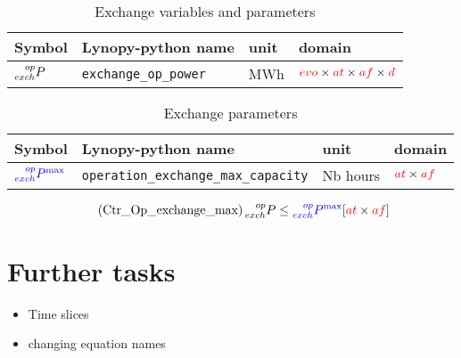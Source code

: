 \documentclass[a4paper,11pt]{article}
\begin{document}
\begin{table}[h]
\footnotesize %
  \centering
    \caption{Exchange variables and parameters}
  \begin{tabular}{llll}
    \hline
    
    \textbf{Symbol} & \textbf{Lynopy-python name} & \textbf{unit}  & \textbf{domain} \\ \hline
    
    $ \prescript{op}{exch}{P}$ & \verb|exchange_op_power|  & MWh & $\textcolor{red}{evo} \times \textcolor{red}{at} \times  \textcolor{red}{af} \times \textcolor{red}{d}$  \\
    
  \end{tabular}
\end{table}


  \begin{table}[h]
\footnotesize %
  \centering

\caption{Exchange parameters}


\begin{tabular}{llll}
\hline
    \textbf{Symbol} & \textbf{Lynopy-python name} & \textbf{unit}  & \textbf{domain} \\ \hline
    
    $\textcolor{blue}{\prescript{op}{exch}{P^{\max}}}$&  \verb|operation_exchange_max_capacity| & Nb hours & $\textcolor{red}{at} \times \textcolor{red}{af} $ \\ 
  \end{tabular}
\end{table}

\begin{equation} \tag{Ctr\_Op\_exchange\_max}
   \prescript{op}{exch}{P} \leq \textcolor{blue}{\prescript{op}{exch}{P^{\max}}}  \hfill [ \textcolor{red}{at} \times \textcolor{red}{af}]
\label{eq:Ctr_Op_exchange_max}
\end{equation}




\section{Further tasks}
\begin{itemize}
    \item Time slices 
    \item changing equation names 
\end{itemize}
\end{document}
